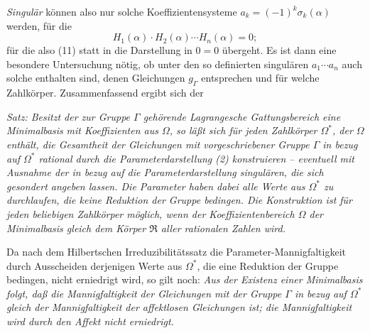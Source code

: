 \emph{Singulär} können also nur solche Koeffizientensysteme $a_k=(-1)^k\sigma_k(\alpha)$ werden, für die
\[
H_1(\alpha)\cdot H_2(\alpha)\cdots H_n(\alpha)=0;
\]
für die also (11) statt in die Darstellung in $0=0$ übergeht. Es ist dann eine besondere Untersuchung nötig, ob unter den so definierten singulären $a_1\cdots a_n$ auch solche enthalten sind, denen Gleichungen $g_\Gamma$ entsprechen und für welche Zahlkörper. Zusammenfassend ergibt sich der

\emph{Satz: Besitzt der zur Gruppe $\Gamma$ gehörende Lagrangesche Gattungsbereich eine Minimalbasis} \emph{mit Koeffizienten aus $\Omega$, so läßt sich für jeden Zahlkörper $\Omega^*$, der $\Omega$ enthält, die Gesamtheit der Gleichungen mit vorgeschriebener Gruppe $\Gamma$ in bezug auf $\Omega^*$ rational durch die Parameterdarstellung (2) konstruieren -- eventuell mit Ausnahme der in bezug auf die Parameterdarstellung singulären, die sich gesondert angeben lassen. Die Parameter haben dabei alle Werte aus $\Omega^*$ zu durchlaufen, die keine Reduktion der Gruppe bedingen. Die Konstruktion ist für jeden beliebigen Zahlkörper möglich, wenn der Koeffizientenbereich $\Omega$ der Minimalbasis gleich dem Körper $\mathfrak R$ aller rationalen Zahlen wird.}

Da nach dem Hilbertschen Irreduzibilitätssatz die Parameter-Mannigfaltigkeit durch Ausscheiden derjenigen Werte aus $\Omega^*$, die eine Reduktion der Gruppe bedingen, nicht erniedrigt wird, so gilt noch: \emph{Aus der Existenz einer Minimalbasis folgt, daß die Mannigfaltigkeit der Gleichungen mit der Gruppe $\Gamma$ in bezug auf $\Omega^*$ gleich der Mannigfaltigkeit der affektlosen Gleichungen ist; die Mannigfaltigkeit wird durch den Affekt nicht erniedrigt.}

